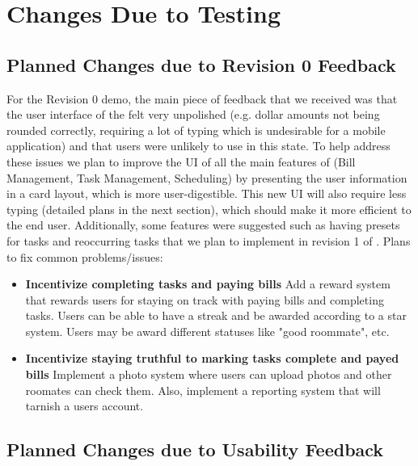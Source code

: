 \documentclass[12pt, titlepage]{article}
\begin{document}
\section{Changes Due to Testing}



\subsection{Planned Changes due to Revision 0 Feedback}

For the Revision 0 demo, the main piece of feedback that we received was that the user interface of the \progname{} felt very unpolished (e.g. dollar amounts not being rounded correctly, requiring a lot of typing which is undesirable for a mobile application) and that users were unlikely to use \progname{} in this state. To help address these issues we plan to improve the UI of all the main features of \progname{} (Bill Management, Task Management, Scheduling) by presenting the user information in a card layout, which is more user-digestible. This new UI will also require less typing (detailed plans in the next section), which should make it more efficient to the end user.  Additionally, some features were suggested such as having presets for tasks and reoccurring tasks that we plan to implement in revision 1 of \progname{}.
\newline Plans to fix common problems/issues:

\begin{itemize}
  \item \textbf{Incentivize completing tasks and paying bills } Add a reward system that rewards users for staying on track with paying bills and completing tasks. Users can be able to have a streak and be awarded according to a star system. Users may be award different statuses like "good roommate", etc.
    \item \textbf{Incentivize staying truthful to marking tasks complete and payed bills } Implement a photo system where users can upload photos and other roomates can check them. Also, implement a reporting system that will tarnish a users account.
\end{itemize}

\subsection{Planned Changes due to Usability Feedback}
\end{document}
